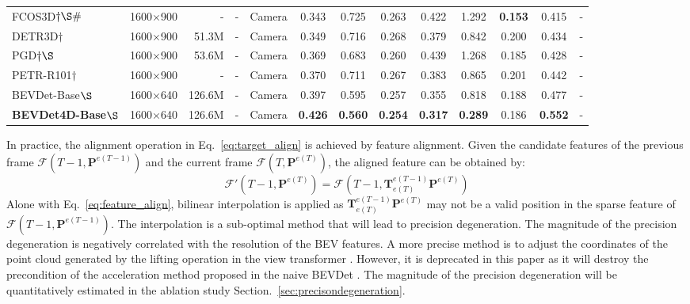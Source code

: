 \documentclass[10pt,twocolumn,letterpaper]{article}
\begin{document}
\begin{table*}[t]
{\begin{tabular}{l|crrc|cccccc|c|r}
    \hline
    FCOS3D$\dag\S\#$ \cite{FCOS3D}&1600$\times$900  &-          &-          & Camera   & 0.343         & 0.725             & 0.263              & 0.422             & 1.292             & \textbf{0.153}    & 0.415           &-\\
    DETR3D$\dag$ \cite{DETR3D}  &1600$\times$900    &51.3M      &-          & Camera   & 0.349         & 0.716             & 0.268              & 0.379             & 0.842             & 0.200             & 0.434           &-\\
    PGD$\dag\S$ \cite{PGD}      &1600$\times$900    &53.6M      &-          & Camera   & 0.369         & 0.683             & 0.260              & 0.439             & 1.268             & 0.185             & 0.428           &-\\
    PETR-R101$\dag$ \cite{PETR}&1600$\times$900     &-         &-           & Camera   & 0.370         & 0.711             & 0.267              & 0.383             & 0.865             & 0.201             & 0.442           &-\\
    BEVDet-Base$\S$\cite{BEVDet}&1600$\times$640    &126.6M     &-          & Camera   & 0.397         & 0.595             & 0.257              & 0.355             & 0.818             & 0.188             & 0.477           &-\\
    \textbf{BEVDet4D-Base}$\S$ &1600$\times$640    &126.6M     &-           & Camera   & \textbf{0.426}& \textbf{0.560}    & \textbf{0.254}     & \textbf{0.317}    & \textbf{0.289}    & 0.186             & \textbf{0.552}  &-\\
    \hline

    \hline
    \end{tabular}}
  \label{tab:nus-val}\end{table*}


In practice, the alignment operation in Eq.~\ref{eq:target_align} is achieved by feature alignment. Given the candidate features of the previous frame $\mathcal{F}(T-1,\textbf{P}^{e(T-1)})$ and the current frame $\mathcal{F}(T,\textbf{P}^{e(T)})$, the aligned feature can be obtained by:
\begin{equation}
\label{eq:feature_align}
    \mathcal{F}'(T-1,\textbf{P}^{e(T)}) = \mathcal{F}(T-1,\textbf{T}^{e(T-1)}_{e(T)}\textbf{P}^{e(T)})
\end{equation}
Alone with Eq.~\ref{eq:feature_align}, bilinear interpolation is applied as $\textbf{T}^{e(T-1)}_{e(T)}\textbf{P}^{e(T)}$ may not be a valid position in the sparse feature of $\mathcal{F}(T-1,\textbf{P}^{e(T-1)})$. The interpolation is a sub-optimal method that will lead to precision degeneration. The magnitude of the precision degeneration is negatively correlated with the resolution of the BEV features. A more precise method is to adjust the coordinates of the point cloud generated by the lifting operation in the view transformer \cite{LSS}. However, it is deprecated in this paper as it will destroy the precondition of the acceleration method proposed in the naive BEVDet \cite{BEVDet}.  The magnitude of the precision degeneration will be quantitatively estimated in the ablation study Section.~\ref{sec:precisondegeneration}.
\end{document}
